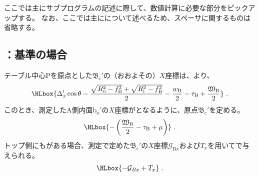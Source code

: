 

ここでは主にサブプログラムの記述に際して、数値計算に必要な部分をピックアップする。
なお、ここでは主に\DMC について述べるため、スペーサに関するものは省略する。





\subsection{\OutcutCenter：\BottomOutcutAsideThickness 基準の場合}
テーブル中心Pを原点とした\BottomOutcutCenter$\mathfrak B_\mathrm c'$の（おおよその）$X$座標は、より、
\begin{align*}
  \HLbox{%
    \Delta_x'\cos\theta
    -\frac{\sqrt{R_\mathrm o^2-f_\mathrm B^2}+\sqrt{R_\mathrm i^2-f_\mathrm B^2}}2
    -\frac{w_\mathrm B}2
    -\tau_\mathrm B
    +\frac{\mathfrak W_\mathrm B}2
  }\ .
\end{align*}
このとき、測定したA側内面b$_\mathrm o'$の$X$座標がとなるように、原点$\mathfrak B_\mathrm c'$を定める。
\begin{align*}
  \HLbox{-\left(\frac{\mathfrak W_\mathrm B}2-\tau_\mathrm B+\mu\right)}\ .
\end{align*}
トップ側にも\Outcut がある場合、測定で定めた$\mathfrak B_\mathrm c'$の$X$座標$\mathcal G_{\mathrm Bx}$および\CenterlineEndFaceDifAC$T_x$を用いてで与えられる。
\begin{align*}
  \HLbox{-\mathcal G_{Bx}+T_x}\ .
\end{align*}


